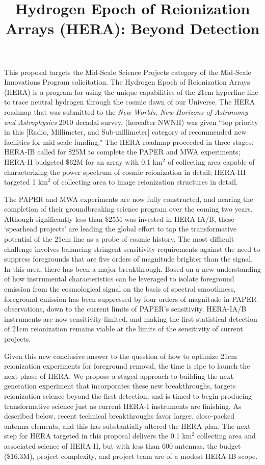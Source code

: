 \documentclass[preprint]{aastex}
\begin{document}
\title{Hydrogen Epoch of Reionization Arrays (HERA): Beyond Detection}

This proposal targets the Mid-Scale Science Projects category of the 
Mid-Scale Innovations Program solicitation.
The Hydrogen Epoch of Reionization Arrays (HERA) is a program for using the
unique capabilities of the 21cm hyperfine line to trace neutral hydrogen
through the cosmic dawn of our Universe.  The HERA roadmap that was submitted
to the {\it New Worlds, New Horizons of Astronomy and Astrophysics} 2010
decadal survey, (hereafter NWNH) was given ``top priority in this [Radio,
Millimeter, and Sub-millimeter] category of recommended new facilities for
mid-scale funding." The HERA roadmap proceeded in three stages: HERA-IB called
for \$25M to complete the PAPER and MWA experiments; HERA-II budgeted \$62M for
an array with 0.1 km$^2$ of collecting area capable of characterizing the power
spectrum of cosmic reionization in detail; HERA-III targeted 1 km$^2$ of
collecting area to image reionization structures in detail.

The PAPER and MWA experiments are now fully constructed, and nearing the
completion of their groundbreaking science program over the coming two years.
Although significantly less than \$25M was invested in HERA-IA/B, these
`spearhead projects' are leading the global effort to tap the transformative
potential of the 21cm line as a probe of cosmic history.
The most difficult challenge involves balancing stringent sensitivity requirements 
against the need to suppress
foregrounds that are five orders of magnitude brighter than the signal.   In
this area, there has been a major breakthrough.  Based on a new understanding
of how instrumental characteristics can be leveraged to isolate foreground
emission from the cosmological signal on the basis of spectral smoothness,
foreground emission has been suppressed by four orders of magnitude in PAPER
observations, down to the current limits of PAPER's sensitivity.  HERA-IA/B instruments
are now sensitivity-limited, and making the first statistical detection of 21cm
reionization remains viable at the limits of the sensitivity of current
projects.

Given this new conclusive answer to the question of how to optimize 21cm reionization
experiments for foreground removal,
the time is ripe to launch the next phase of HERA.  We propose a
staged approach to building the next-generation experiment that incorporates these
new breakthroughs, targets reionization science beyond the first detection, and
is timed to begin producing transformative science just as current HERA-I instruments
are finishing.  As described below, recent technical breakthroughs favor
larger, close-packed antenna elements, and this has substantially altered the
HERA plan.  The next step for HERA targeted in this proposal delivers the 0.1
km$^2$ collecting area and associated science of HERA-II, but with less than
600 antennas, the budget (\$16.3M), project complexity, and project team are of
a modest HERA-IB scope.
\end{document}
